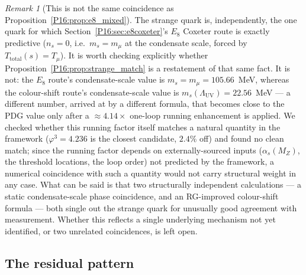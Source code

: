 \documentclass[11pt,a4paper]{article}
\theoremstyle{definition}\newtheorem{definition}[theorem]{Definition}
\theoremstyle{remark}
\newtheorem{remark}[theorem]{Remark}
\theoremstyle{definition}\newtheorem{construction}[theorem]{Construction}
\newcommand{\vp}{\varphi}
\newcommand{\LUV}{\Lambda_{\mathrm{UV}}}
\begin{document}
\begin{remark}[This is not the same coincidence as Proposition~\ref{P16:prop:e8_mixed}]
\label{P16:rem:two_strange_results}
The strange quark is, independently, the one quark for which
Section~\ref{P16:sec:e8coxeter}'s $E_8$ Coxeter route is exactly
predictive ($n_s=0$, i.e.\ $m_s=m_\mu$ at the condensate scale,
forced by $T_{\mathrm{total}}(s)=T_\mu$). It is worth checking
explicitly whether Proposition~\ref{P16:prop:strange_match} is a
restatement of that same fact. It is not: the $E_8$ route's
condensate-scale value is $m_s=m_\mu=105.66$~MeV, whereas the
colour-shift route's condensate-scale value is $m_s(\LUV)=22.56$~MeV
--- a different number, arrived at by a different formula, that
becomes close to the PDG value only after a $\approx4.14\times$
one-loop running enhancement is applied. We checked whether this
running factor itself matches a natural quantity in the framework
($\vp^3=4.236$ is the closest candidate, $2.4\%$ off) and found no
clean match; since the running factor depends on externally-sourced
inputs ($\alpha_s(M_Z)$, the threshold locations, the loop order) not
predicted by the framework, a numerical coincidence with such a
quantity would not carry structural weight in any case. What can be
said is that two structurally independent calculations ---
a static condensate-scale phase coincidence, and an RG-improved
colour-shift formula --- both single out the strange quark for
unusually good agreement with measurement. Whether this reflects a
single underlying mechanism not yet identified, or two unrelated
coincidences, is left open.
\end{remark}

\subsection{The residual pattern}
\end{document}

